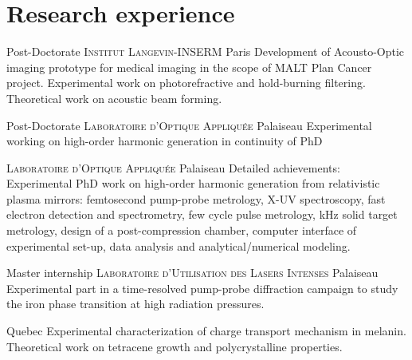 \documentclass[11pt,a4paper,sans]{moderncv} %
\begin{document}

\section{Research experience}


{Post-Doctorate}
{\textsc{Institut Langevin-INSERM}}
{Paris}
{}
{Development of Acousto-Optic imaging prototype for medical imaging in the scope of MALT Plan Cancer project. Experimental work on photorefractive and hold-burning filtering. Theoretical work on acoustic beam forming.}

{Post-Doctorate}
{\textsc{Laboratoire d'Optique Appliquée}}
{Palaiseau}
{}
{Experimental working on high-order harmonic generation in continuity of PhD}

{%
\textsc{Laboratoire d'Optique Appliquée}}
{%
Palaiseau}
{}
{%
Detailed achievements:
Experimental PhD work on high-order harmonic generation from relativistic plasma mirrors: femtosecond pump-probe metrology, X-UV spectroscopy, fast electron detection and spectrometry, few cycle pulse metrology, kHz solid target metrology, design of a post-compression chamber, computer interface of experimental set-up, data analysis and analytical/numerical modeling. 
}


{Master internship}
{\textsc{Laboratoire d'Utilisation des Lasers Intenses}}
{Palaiseau}
{}
{Experimental part in a time-resolved pump-probe diffraction campaign to study the iron phase transition at high radiation pressures. }




{Quebec}
{}
{Experimental characterization of charge transport mechanism in melanin. Theoretical work on tetracene growth and polycrystalline properties.}

\end{document}
